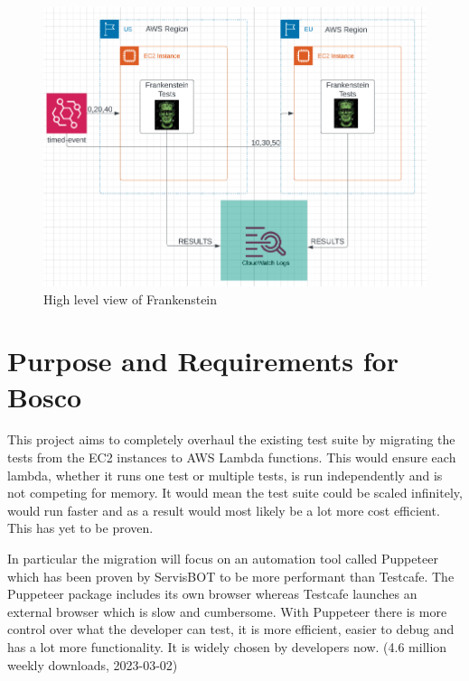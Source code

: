 \documentclass[12pt,a4paper,titlepage]{report}
\begin{document}
 \begin{figure}[ht]
  \centering
  \includegraphics[width=\textwidth,height=\textheight,keepaspectratio]{./diagrams/frank_high_level.png}
  \caption{High level view of Frankenstein}
 \end{figure}
 \clearpage

\section{Purpose and Requirements for Bosco}

This project aims to completely overhaul the existing test suite by migrating the tests from the EC2 instances to AWS Lambda functions. This would ensure each lambda, whether it runs one test or multiple tests, is run independently and is not competing for memory. It would mean the test suite could be scaled infinitely, would run faster and as a result would most likely be a lot more cost efficient. This has yet to be proven.

In particular the migration will focus on an automation tool called Puppeteer which has been proven by ServisBOT to be more performant than Testcafe. The Puppeteer package includes its own browser whereas Testcafe launches an external browser which is slow and cumbersome. With Puppeteer there is more control over what the developer can test, it is more efficient, easier to debug and has a lot more functionality. It is widely chosen by developers now. (4.6 million weekly downloads, 2023-03-02) \cite{Puppeteer}
\end{document}
